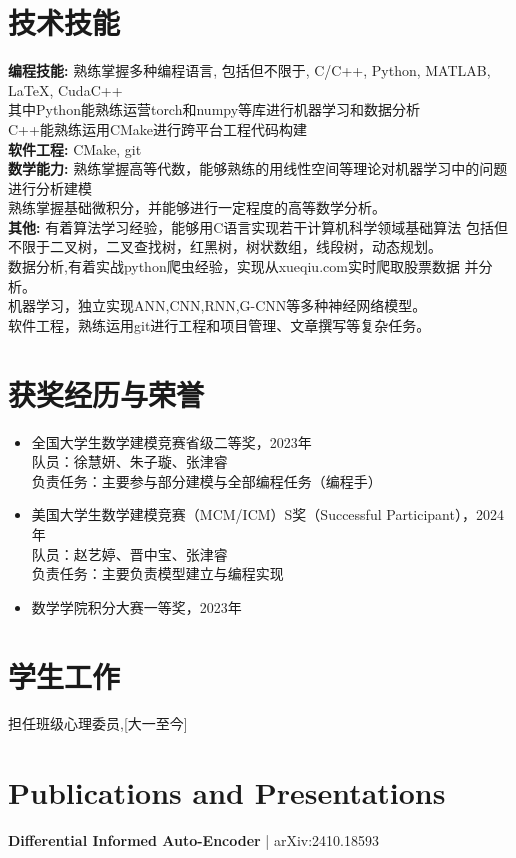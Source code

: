 \documentclass[a4paper,10pt]{article}
\begin{document}
\section*{技术技能}
\textbf{编程技能:} 熟练掌握多种编程语言, 包括但不限于, C/C++, Python, MATLAB, LaTeX, CudaC++  \\
其中Python能熟练运营torch和numpy等库进行机器学习和数据分析 \\
C++能熟练运用CMake进行跨平台工程代码构建 \\
\textbf{软件工程:} CMake, git \\
\textbf{数学能力:} 熟练掌握高等代数，能够熟练的用线性空间等理论对机器学习中的问题进行分析建模 \\
熟练掌握基础微积分，并能够进行一定程度的高等数学分析。\\
\textbf{其他:} 有着算法学习经验，能够用C语言实现若干计算机科学领域基础算法
包括但不限于二叉树，二叉查找树，红黑树，树状数组，线段树，动态规划。\\
数据分析,有着实战python爬虫经验，实现从xueqiu.com实时爬取股票数据
并分析。\\
机器学习，独立实现ANN,CNN,RNN,G-CNN等多种神经网络模型。\\
软件工程，熟练运用git进行工程和项目管理、文章撰写等复杂任务。

\section*{获奖经历与荣誉}
\begin{itemize}
    \item 全国大学生数学建模竞赛省级二等奖，2023年 \\
          队员：徐慧妍、朱子璇、张津睿 \\
          负责任务：主要参与部分建模与全部编程任务（编程手）
    \item 美国大学生数学建模竞赛（MCM/ICM）S奖（Successful Participant），2024年 \\
          队员：赵艺婷、晋中宝、张津睿 \\
          负责任务：主要负责模型建立与编程实现
    \item 数学学院积分大赛一等奖，2023年
\end{itemize}

\section*{学生工作}
担任班级心理委员,[大一至今]


\section*{Publications and Presentations}
\textbf{Differential Informed Auto-Encoder} | arXiv:2410.18593  \\



\printbibliography
\end{document}
